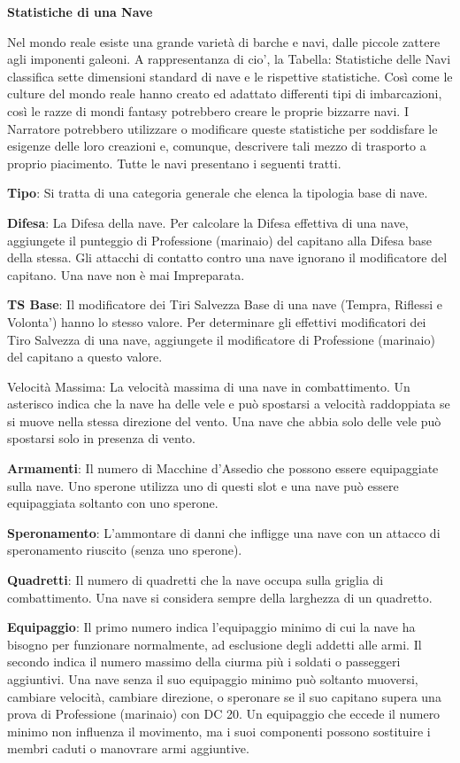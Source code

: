 \documentclass[a4paper,11pt,twoside,openany]{book}
\begin{document}
\textbf{Statistiche di una Nave}

Nel mondo reale esiste una grande varietà di barche e navi, dalle piccole zattere agli imponenti galeoni. A rappresentanza di cio', la Tabella: Statistiche delle Navi classifica sette dimensioni standard di nave e le rispettive statistiche. Così come le culture del mondo reale hanno creato ed adattato differenti tipi di imbarcazioni, così le razze di mondi fantasy potrebbero creare le proprie bizzarre navi.
I Narratore potrebbero utilizzare o modificare queste statistiche per soddisfare le esigenze delle loro creazioni e, comunque, descrivere tali mezzo di trasporto a proprio piacimento. Tutte le navi presentano i seguenti tratti.

\textbf{Tipo}: Si tratta di una categoria generale che elenca la tipologia base di nave.

\textbf{Difesa}: La Difesa della nave. Per calcolare la Difesa effettiva di una nave, aggiungete il punteggio di Professione (marinaio) del capitano alla Difesa base della stessa. Gli attacchi di contatto contro una nave ignorano il modificatore del capitano. Una nave non è mai Impreparata.

\textbf{TS Base}: Il modificatore dei Tiri Salvezza Base di una nave (Tempra, Riflessi e Volonta') hanno lo stesso valore. Per determinare gli effettivi modificatori dei Tiro Salvezza di una nave, aggiungete il modificatore di Professione (marinaio) del capitano a questo valore.

Velocità Massima: La velocità massima di una nave in combattimento. Un asterisco indica che la nave ha delle vele e può spostarsi a velocità raddoppiata se si muove nella stessa direzione del vento. Una nave che abbia solo delle vele può spostarsi solo in presenza di vento.

\textbf{Armamenti}: Il numero di Macchine d'Assedio che possono essere equipaggiate sulla nave. Uno sperone utilizza uno di questi slot e una nave può essere equipaggiata soltanto con uno sperone.

\textbf{Speronamento}: L'ammontare di danni che infligge una nave con un attacco di speronamento riuscito (senza uno sperone).

\textbf{Quadretti}: Il numero di quadretti che la nave occupa sulla griglia di combattimento. Una nave si considera sempre della larghezza di un quadretto.

\textbf{Equipaggio}: Il primo numero indica l'equipaggio minimo di cui la nave ha bisogno per funzionare normalmente, ad esclusione degli addetti alle armi. Il secondo indica il numero massimo della ciurma più i soldati o passeggeri aggiuntivi. Una nave senza il suo equipaggio minimo può soltanto muoversi, cambiare velocità, cambiare direzione, o speronare se il suo capitano supera una prova di Professione (marinaio) con DC 20.
Un equipaggio che eccede il numero minimo non influenza il movimento, ma i suoi componenti possono sostituire i membri caduti o manovrare armi aggiuntive.
\end{document}
